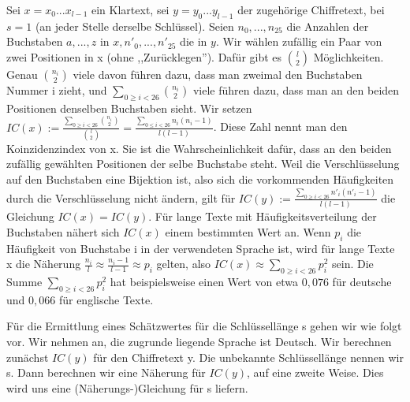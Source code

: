 \documentclass[a4paper]{article}
\begin{document}
\begin{multicols}{3}
    Sei $x=x_0...x_{l-1}$ ein Klartext, sei $y=y_0...y_{l-1}$ der zugehörige Chiffretext, bei $s=1$ (an jeder Stelle derselbe Schlüssel). Seien $n_0,...,n_{25}$ die Anzahlen der Buchstaben $a,...,z$ in $x,n'_0,...,n'_25$ die in $y$. Wir wählen zufällig ein Paar von zwei Positionen in x (ohne ,,Zurücklegen''). Dafür gibt es $\binom{l}{2}$ Möglichkeiten. Genau $\binom{n_i}{2}$ viele davon führen dazu, dass man zweimal den Buchstaben Nummer i zieht, und $\sum_{0\geq i<26}\binom{n_i}{2}$ viele führen dazu, dass man an den beiden Positionen denselben Buchstaben sieht. Wir setzen $IC(x):=\frac{\sum_{0\geq i<26}\binom{n_i}{2}}{\binom{l}{2}}=\frac{\sum_{0\leq i<26}n_i(n_i-1)}{l(l-1)}$.
    Diese Zahl nennt man den Koinzidenzindex von x. Sie ist die Wahrscheinlichkeit dafür, dass an den beiden zufällig gewählten Positionen der selbe Buchstabe steht. Weil die Verschlüsselung auf den Buchstaben eine Bijektion ist, also sich die vorkommenden Häufigkeiten durch die Verschlüsselung nicht ändern, gilt für $IC(y):=\frac{\sum_{0\geq i<26} n'_i(n'_i -1)}{l(l-1)}$ die Gleichung $IC(x)=IC(y)$.
    Für lange Texte mit Häufigkeitsverteilung der Buchstaben nähert sich $IC(x)$ einem bestimmten Wert an. Wenn $p_i$ die Häufigkeit von Buchstabe i in der verwendeten Sprache ist, wird für lange Texte x die Näherung $\frac{n_i}{l}\approx\frac{n_i-1}{l-1}\approx p_i$ gelten, also $IC(x)\approx \sum_{0\geq i<26} p^2_i$ sein. Die Summe $\sum_{0\geq i<26} p^2_i$ hat beispielsweise einen Wert von etwa $0,076$ für deutsche und $0,066$ für englische Texte. %

    Für die Ermittlung eines Schätzwertes für die Schlüssellänge s gehen wir wie folgt vor. Wir nehmen an, die zugrunde liegende Sprache ist Deutsch. Wir berechnen zunächst $IC(y)$ für den Chiffretext y. Die unbekannte Schlüssellänge nennen wir s. Dann berechnen wir eine Näherung für $IC(y)$, auf eine zweite Weise. Dies wird uns eine (Näherungs-)Gleichung für s liefern.


\end{multicols}
\end{document}
